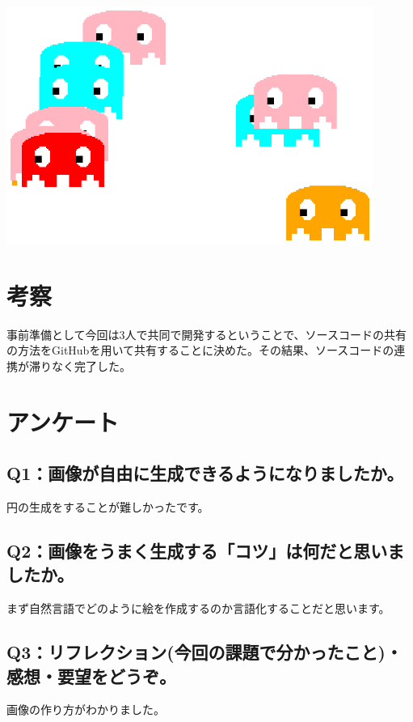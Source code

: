\documentclass[12pt,a4j]{jarticle}
\begin{document}
\begin{center}
\includegraphics[width=12cm]{packman.ps}
\end{center}

\section{考察}

事前準備として今回は3人で共同で開発するということで、ソースコードの共有の方法をGitHubを用いて共有することに決めた。その結果、ソースコードの連携が滞りなく完了した。\verb||

\section{アンケート}

\subsection{Q1：画像が自由に生成できるようになりましたか。}

円の生成をすることが難しかったです。

\subsection{Q2：画像をうまく生成する「コツ」は何だと思いましたか。}

まず自然言語でどのように絵を作成するのか言語化することだと思います。

\subsection{Q3：リフレクション(今回の課題で分かったこと)・感想・要望をどうぞ。}

画像の作り方がわかりました。
\end{document}
